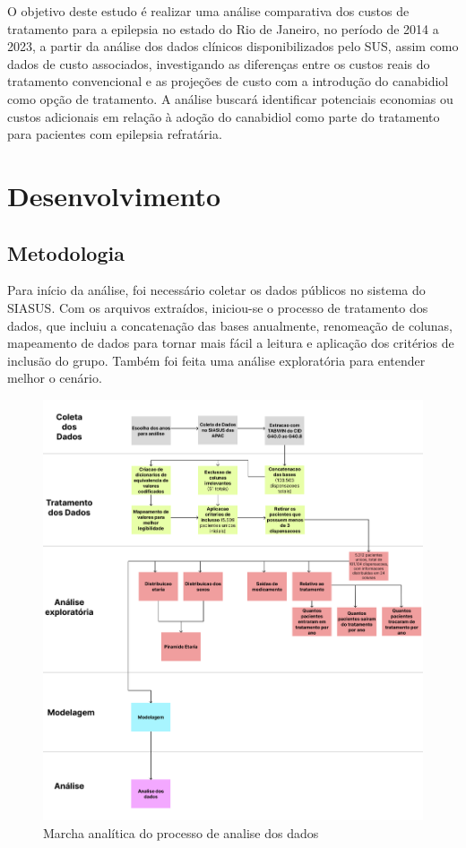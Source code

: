 \documentclass[article,a4paper,12pt,brazil,sumario=tradicional]{abntex2}
\begin{document}
O objetivo deste estudo é realizar uma análise comparativa dos custos de tratamento para a epilepsia no estado do Rio de Janeiro, no período de 2014 a 2023, a partir da análise dos dados clínicos disponibilizados pelo SUS, assim como dados de custo associados, investigando as diferenças entre os custos reais do tratamento convencional e as projeções de custo com a introdução do canabidiol como opção de tratamento. A análise buscará identificar potenciais economias ou custos adicionais em relação à adoção do canabidiol como parte do tratamento para pacientes com epilepsia refratária.

\section{Desenvolvimento}

\subsection{Metodologia}

Para início da análise, foi necessário coletar os dados públicos no sistema do SIASUS. Com os arquivos extraídos, iniciou-se o processo de tratamento dos dados, que incluiu a concatenação das bases anualmente, renomeação de colunas, mapeamento de dados para tornar mais fácil a leitura e aplicação dos critérios de inclusão do grupo. Também foi feita uma análise exploratória para entender melhor o cenário.

\begin{figure}[!ht]
    \centering
    \includegraphics[width=1\textwidth]{marcha_analitica.png}
    \caption{Marcha analítica do processo de analise dos dados}
\end{figure}
\end{document}
